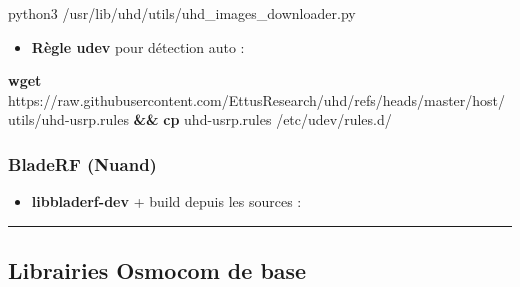 \documentclass[
  french,
]{article}
\newenvironment{Shaded}{\begin{snugshade}}{\end{snugshade}}
\newcommand{\AttributeTok}[1]{\textcolor[rgb]{0.13,0.29,0.53}{#1}}
\newcommand{\BuiltInTok}[1]{#1}
\newcommand{\ExtensionTok}[1]{#1}
\newcommand{\FunctionTok}[1]{\textcolor[rgb]{0.13,0.29,0.53}{\textbf{#1}}}
\newcommand{\KeywordTok}[1]{\textcolor[rgb]{0.13,0.29,0.53}{\textbf{#1}}}
\newcommand{\NormalTok}[1]{#1}
\newcommand{\VariableTok}[1]{\textcolor[rgb]{0.00,0.00,0.00}{#1}}
\providecommand{\tightlist}{%
  \setlength{\itemsep}{0pt}\setlength{\parskip}{0pt}}
\begin{document}
\begin{Shaded}
\begin{Highlighting}[]
\ExtensionTok{python3}\NormalTok{ /usr/lib/uhd/utils/uhd\_images\_downloader.py}
\end{Highlighting}
\end{Shaded}

\begin{itemize}
\tightlist
\item
  \textbf{Règle udev} pour détection auto :
\end{itemize}

\begin{Shaded}
\begin{Highlighting}[]
\FunctionTok{wget}\NormalTok{ https://raw.githubusercontent.com/EttusResearch/uhd/refs/heads/master/host/utils/uhd{-}usrp.rules }\KeywordTok{\&\&} \FunctionTok{cp}\NormalTok{ uhd{-}usrp.rules /etc/udev/rules.d/}
\end{Highlighting}
\end{Shaded}

\subsubsection{BladeRF (Nuand)}\label{bladerf-nuand}

\begin{itemize}
\tightlist
\item
  \textbf{libbladerf-dev} + build depuis les sources :
\end{itemize}

\begin{Shaded}
\end{Shaded}

\begin{center}\rule{0.5\linewidth}{0.5pt}\end{center}

\subsection{Librairies Osmocom de
base}\label{librairies-osmocom-de-base}
\end{document}
